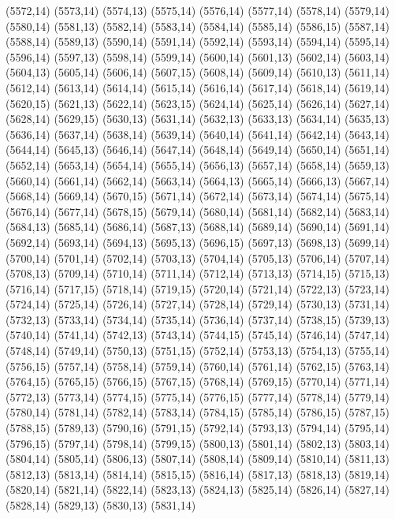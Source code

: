 (5572,14)
(5573,14)
(5574,13)
(5575,14)
(5576,14)
(5577,14)
(5578,14)
(5579,14)
(5580,14)
(5581,13)
(5582,14)
(5583,14)
(5584,14)
(5585,14)
(5586,15)
(5587,14)
(5588,14)
(5589,13)
(5590,14)
(5591,14)
(5592,14)
(5593,14)
(5594,14)
(5595,14)
(5596,14)
(5597,13)
(5598,14)
(5599,14)
(5600,14)
(5601,13)
(5602,14)
(5603,14)
(5604,13)
(5605,14)
(5606,14)
(5607,15)
(5608,14)
(5609,14)
(5610,13)
(5611,14)
(5612,14)
(5613,14)
(5614,14)
(5615,14)
(5616,14)
(5617,14)
(5618,14)
(5619,14)
(5620,15)
(5621,13)
(5622,14)
(5623,15)
(5624,14)
(5625,14)
(5626,14)
(5627,14)
(5628,14)
(5629,15)
(5630,13)
(5631,14)
(5632,13)
(5633,13)
(5634,14)
(5635,13)
(5636,14)
(5637,14)
(5638,14)
(5639,14)
(5640,14)
(5641,14)
(5642,14)
(5643,14)
(5644,14)
(5645,13)
(5646,14)
(5647,14)
(5648,14)
(5649,14)
(5650,14)
(5651,14)
(5652,14)
(5653,14)
(5654,14)
(5655,14)
(5656,13)
(5657,14)
(5658,14)
(5659,13)
(5660,14)
(5661,14)
(5662,14)
(5663,14)
(5664,13)
(5665,14)
(5666,13)
(5667,14)
(5668,14)
(5669,14)
(5670,15)
(5671,14)
(5672,14)
(5673,14)
(5674,14)
(5675,14)
(5676,14)
(5677,14)
(5678,15)
(5679,14)
(5680,14)
(5681,14)
(5682,14)
(5683,14)
(5684,13)
(5685,14)
(5686,14)
(5687,13)
(5688,14)
(5689,14)
(5690,14)
(5691,14)
(5692,14)
(5693,14)
(5694,13)
(5695,13)
(5696,15)
(5697,13)
(5698,13)
(5699,14)
(5700,14)
(5701,14)
(5702,14)
(5703,13)
(5704,14)
(5705,13)
(5706,14)
(5707,14)
(5708,13)
(5709,14)
(5710,14)
(5711,14)
(5712,14)
(5713,13)
(5714,15)
(5715,13)
(5716,14)
(5717,15)
(5718,14)
(5719,15)
(5720,14)
(5721,14)
(5722,13)
(5723,14)
(5724,14)
(5725,14)
(5726,14)
(5727,14)
(5728,14)
(5729,14)
(5730,13)
(5731,14)
(5732,13)
(5733,14)
(5734,14)
(5735,14)
(5736,14)
(5737,14)
(5738,15)
(5739,13)
(5740,14)
(5741,14)
(5742,13)
(5743,14)
(5744,15)
(5745,14)
(5746,14)
(5747,14)
(5748,14)
(5749,14)
(5750,13)
(5751,15)
(5752,14)
(5753,13)
(5754,13)
(5755,14)
(5756,15)
(5757,14)
(5758,14)
(5759,14)
(5760,14)
(5761,14)
(5762,15)
(5763,14)
(5764,15)
(5765,15)
(5766,15)
(5767,15)
(5768,14)
(5769,15)
(5770,14)
(5771,14)
(5772,13)
(5773,14)
(5774,15)
(5775,14)
(5776,15)
(5777,14)
(5778,14)
(5779,14)
(5780,14)
(5781,14)
(5782,14)
(5783,14)
(5784,15)
(5785,14)
(5786,15)
(5787,15)
(5788,15)
(5789,13)
(5790,16)
(5791,15)
(5792,14)
(5793,13)
(5794,14)
(5795,14)
(5796,15)
(5797,14)
(5798,14)
(5799,15)
(5800,13)
(5801,14)
(5802,13)
(5803,14)
(5804,14)
(5805,14)
(5806,13)
(5807,14)
(5808,14)
(5809,14)
(5810,14)
(5811,13)
(5812,13)
(5813,14)
(5814,14)
(5815,15)
(5816,14)
(5817,13)
(5818,13)
(5819,14)
(5820,14)
(5821,14)
(5822,14)
(5823,13)
(5824,13)
(5825,14)
(5826,14)
(5827,14)
(5828,14)
(5829,13)
(5830,13)
(5831,14)
